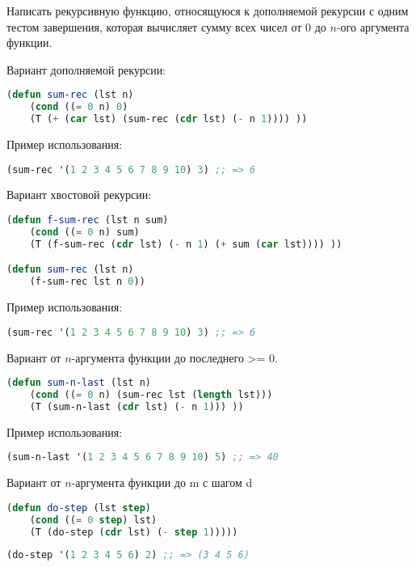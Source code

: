 \documentclass[a4paper,oneside,12pt]{extreport}
\begin{document}
\begin{task}
	Написать рекурсивную функцию, относящуюся к дополняемой рекурсии с одним тестом завершения, 
    которая вычисляет сумму всех чисел от 0 до $n$-ого аргумента функции.
	
    Вариант дополняемой рекурсии:
    \begin{lstlisting}[language=Lisp]
(defun sum-rec (lst n)
	(cond ((= 0 n) 0)
	(T (+ (car lst) (sum-rec (cdr lst) (- n 1)))) ))
    \end{lstlisting}

    Пример использования:
    \begin{lstlisting}[language=Lisp] 
(sum-rec '(1 2 3 4 5 6 7 8 9 10) 3) ;; => 6
    \end{lstlisting}
    
    Вариант хвостовой рекурсии:
    \begin{lstlisting}[language=Lisp]
(defun f-sum-rec (lst n sum)
	(cond ((= 0 n) sum)
	(T (f-sum-rec (cdr lst) (- n 1) (+ sum (car lst)))) ))  

(defun sum-rec (lst n)
	(f-sum-rec lst n 0))
    \end{lstlisting}

    Пример использования:
    \begin{lstlisting}[language=Lisp] 
(sum-rec '(1 2 3 4 5 6 7 8 9 10) 3) ;; => 6
    \end{lstlisting}

    Вариант от $n$-аргумента функции до последнего >= 0.
        
    \begin{lstlisting}[language=Lisp]
(defun sum-n-last (lst n)
    (cond ((= 0 n) (sum-rec lst (length lst)))
    (T (sum-n-last (cdr lst) (- n 1))) ))    
    \end{lstlisting}

    Пример использования:
    \begin{lstlisting}[language=Lisp] 
(sum-n-last '(1 2 3 4 5 6 7 8 9 10) 5) ;; => 40
    \end{lstlisting}

    Вариант от $n$-аргумента функции до m с шагом d
        
    \begin{lstlisting}[language=Lisp]
(defun do-step (lst step)
    (cond ((= 0 step) lst) 
    (T (do-step (cdr lst) (- step 1)))))
    \end{lstlisting}

    \begin{lstlisting}[language=Lisp]
(do-step '(1 2 3 4 5 6) 2) ;; => (3 4 5 6)
    \end{lstlisting}


\end{task}
\end{document}
